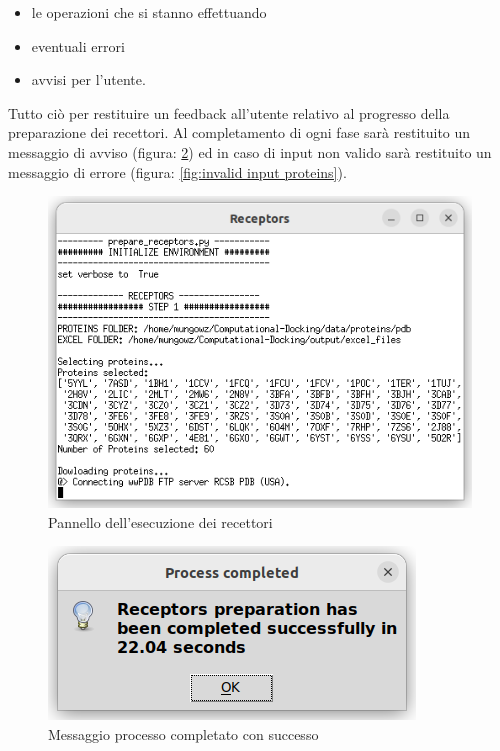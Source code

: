 \begin{itemize}
    \item le operazioni che si stanno effettuando
    \item eventuali errori
    \item avvisi per l'utente.  
\end{itemize}

Tutto ciò per restituire un feedback all'utente relativo al progresso della preparazione dei recettori. Al completamento di ogni fase sarà restituito un messaggio di avviso (figura: \ref{fig:progress completed proteins}) ed in caso di input non valido sarà restituito un messaggio di errore (figura: \ref{fig:invalid input proteins}).

\begin{figure}[H]
    \centering
    \includegraphics[scale=0.8]{immagini/capitolo3/receptorsExecution.png}
    \caption{Pannello dell'esecuzione dei recettori}
    \label{fig:receptors execution}
\end{figure}

\begin{figure}[H]
    \centering
    \includegraphics{immagini/capitolo3/progressCompletedReceptors.png}
    \caption{Messaggio processo completato con successo}
    \label{fig:progress completed proteins}
\end{figure}

